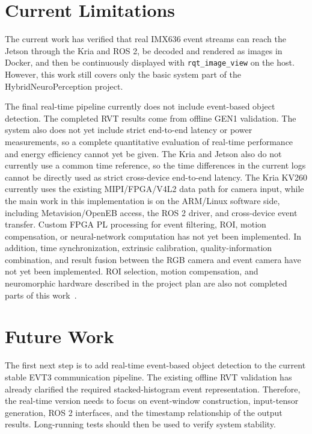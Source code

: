 \section{Current Limitations}

The current work has verified that real IMX636 event streams can reach the Jetson through the Kria and ROS 2, be decoded and rendered as images in Docker, and then be continuously displayed with \texttt{rqt\_image\_view} on the host. However, this work still covers only the basic system part of the HybridNeuroPerception project.

The final real-time pipeline currently does not include event-based object detection. The completed RVT results come from offline GEN1 validation. The system also does not yet include strict end-to-end latency or power measurements, so a complete quantitative evaluation of real-time performance and energy efficiency cannot yet be given. The Kria and Jetson also do not currently use a common time reference, so the time differences in the current logs cannot be directly used as strict cross-device end-to-end latency. The Kria KV260 currently uses the existing MIPI/FPGA/V4L2 data path for camera input, while the main work in this implementation is on the ARM/Linux software side, including Metavision/OpenEB access, the ROS 2 driver, and cross-device event transfer. Custom FPGA PL processing for event filtering, ROI, motion compensation, or neural-network computation has not yet been implemented. In addition, time synchronization, extrinsic calibration, quality-information combination, and result fusion between the RGB camera and event camera have not yet been implemented. ROI selection, motion compensation, and neuromorphic hardware described in the project plan are also not completed parts of this work~\parencite{hybridneuroperceptionGVB2025}.

\section{Future Work}

The first next step is to add real-time event-based object detection to the current stable EVT3 communication pipeline. The existing offline RVT validation has already clarified the required stacked-histogram event representation. Therefore, the real-time version needs to focus on event-window construction, input-tensor generation, ROS 2 interfaces, and the timestamp relationship of the output results. Long-running tests should then be used to verify system stability.

